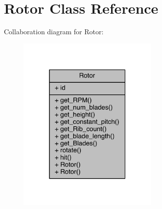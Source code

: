 \hypertarget{class_rotor}{}\section{Rotor Class Reference}
\label{class_rotor}


Collaboration diagram for Rotor\+:
\nopagebreak
\begin{figure}[H]
\begin{center}
\leavevmode
\includegraphics[width=196pt]{doxygen/latex/class_rotor__coll__graph}
\end{center}
\end{figure}
